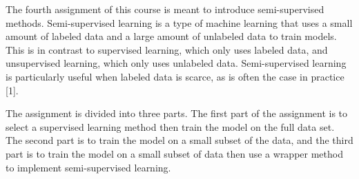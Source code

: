 The fourth assignment of this course is meant to introduce semi-supervised methods. Semi-supervised learning is a type of machine learning that uses a small amount of labeled data and a large amount of unlabeled data to train models. 
This is in contrast to supervised learning, which only uses labeled data, and unsupervised learning, which only uses unlabeled data. Semi-supervised learning is particularly useful when labeled data is scarce, as is often the case in practice [1].\par
The assignment is divided into three parts. The first part of the assignment is to select a supervised learning method then train the model on the full data set. 
The second part is to train the model on a small subset of the data, and the third part is to train the model on a small subset of data then use a wrapper method to implement semi-supervised learning.



